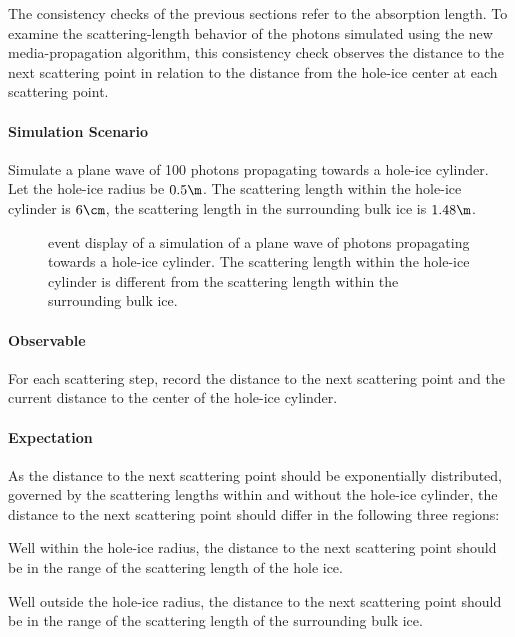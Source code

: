 The consistency checks of the previous sections refer to the absorption length. To examine the scattering-length behavior of the photons simulated using the new media-propagation algorithm, this consistency check observes the distance to the next scattering point in relation to the distance from the hole-ice center at each scattering point.


\paragraph{Simulation Scenario} Simulate a plane wave of 100 photons propagating towards a hole-ice cylinder. Let the hole-ice radius be $0.5\m$. The scattering length within the hole-ice cylinder is $6\cm$, the scattering length in the surrounding bulk ice is $1.48\m$.

\begin{figure}[htbp]
  \caption{ event display of a simulation of a plane wave of photons propagating towards a hole-ice cylinder. The scattering length within the hole-ice cylinder is different from the scattering length within the surrounding bulk ice.}
  \label{fig:An7ik8pu}
\end{figure}

\paragraph{Observable} For each scattering step, record the distance to the next scattering point and the current distance to the center of the hole-ice cylinder.

\paragraph{Expectation} As the distance to the next scattering point should be exponentially distributed, governed by the scattering lengths within and without the hole-ice cylinder, the distance to the next scattering point should differ in the following three regions:

Well within the hole-ice radius, the distance to the next scattering point should be in the range of the scattering length of the hole ice.

Well outside the hole-ice radius, the distance to the next scattering point should be in the range of the scattering length of the surrounding bulk ice.


